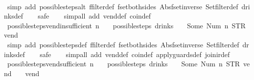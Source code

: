 \begin{isabellebody}
%
\isadelimproof
\ \ %
\endisadelimproof
%
\isatagproof
{}\isamarkupfalse%
\ {\isacharparenleft}simp\ add{\isacharcolon}\ possible{\isacharunderscore}steps{\isacharunderscore}alt\ ffilter{\isacharunderscore}def\ fset{\isacharunderscore}both{\isacharunderscore}sides\ Abs{\isacharunderscore}fset{\isacharunderscore}inverse\ Set{\isachardot}filter{\isacharunderscore}def\ drinks{\isacharunderscore}def{\isacharparenright}\isanewline
\ \ \isamarkupfalse%
\ safe\isanewline
\ \ \isamarkupfalse%
\ {\isacharparenleft}simp{\isacharunderscore}all\ add{\isacharcolon}\ vend{\isacharunderscore}def\ coin{\isacharunderscore}def{\isacharparenright}%
\endisatagproof
{\isafoldproof}%
%
\isadelimproof
\isanewline
%
\endisadelimproof
\isanewline
{}\isamarkupfalse%
\ possible{\isacharunderscore}steps{\isacharunderscore}vend{\isacharunderscore}insufficient{\isacharcolon}\ {\isachardoublequoteopen}n\ {\isasymle}\ {}\ {\isasymLongrightarrow}\ possible{\isacharunderscore}steps\ drinks\ {}\ {\isacharless}{}\ {\isachardollar}{\isacharcolon}{\isacharequal}\ Some\ {\isacharparenleft}Num\ n{\isacharparenright}{\isachargreater}\ STR\ {\isacharprime}{\isacharprime}vend{\isacharprime}{\isacharprime}\ {\isacharbrackleft}{\isacharbrackright}\ {\isacharequal}\ {\isacharbraceleft}{\isacharbar}{\isacharbar}{\isacharbraceright}{\isachardoublequoteclose}\isanewline
%
\isadelimproof
\ \ %
\endisadelimproof
%
\isatagproof
{}\isamarkupfalse%
\ {\isacharparenleft}simp\ add{\isacharcolon}\ possible{\isacharunderscore}steps{\isacharunderscore}def\ ffilter{\isacharunderscore}def\ fset{\isacharunderscore}both{\isacharunderscore}sides\ Abs{\isacharunderscore}fset{\isacharunderscore}inverse\ Set{\isachardot}filter{\isacharunderscore}def\ drinks{\isacharunderscore}def{\isacharparenright}\isanewline
\ \ \isamarkupfalse%
\ safe\isanewline
\ \ \isamarkupfalse%
\ {\isacharparenleft}simp{\isacharunderscore}all\ add{\isacharcolon}\ vend{\isacharunderscore}def\ coin{\isacharunderscore}def\ apply{\isacharunderscore}guards{\isacharunderscore}def\ join{\isacharunderscore}ir{\isacharunderscore}def{\isacharparenright}%
\endisatagproof
{\isafoldproof}%
%
\isadelimproof
\isanewline
%
\endisadelimproof
\isanewline
{}\isamarkupfalse%
\ possible{\isacharunderscore}steps{\isacharunderscore}vend{\isacharunderscore}sufficient{\isacharcolon}\ {\isachardoublequoteopen}n\ {\isachargreater}\ {}\ {\isasymLongrightarrow}\ possible{\isacharunderscore}steps\ drinks\ {}\ {\isacharless}{}\ {\isachardollar}{\isacharcolon}{\isacharequal}\ Some\ {\isacharparenleft}Num\ n{\isacharparenright}{\isachargreater}\ STR\ {\isacharprime}{\isacharprime}vend{\isacharprime}{\isacharprime}\ {\isacharbrackleft}{\isacharbrackright}\ {\isacharequal}\ {\isacharbraceleft}{\isacharbar}{\isacharparenleft}{}{\isacharcomma}\ vend{\isacharparenright}{\isacharbar}{\isacharbraceright}{\isachardoublequoteclose}\isanewline

\end{isabellebody}
